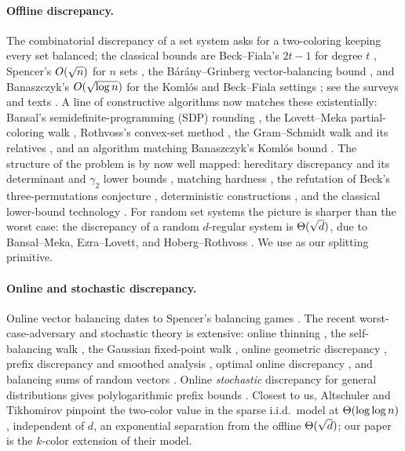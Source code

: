 \paragraph{Offline discrepancy.}
The combinatorial discrepancy of a set system asks for a two-coloring keeping every set balanced; the classical bounds are
Beck--Fiala's $2t-1$ for degree $t$ \cite{BeckFiala1981}, Spencer's $O(\sqrt n)$ for $n$ sets \cite{Spencer1985}, the
Bárány--Grinberg vector-balancing bound \cite{BaranyGrinberg1981}, and Banaszczyk's $O(\sqrt{\log n})$ for the Komlós and
Beck--Fiala settings \cite{Banaszczyk1998}; see the surveys and texts \cite{BeckSos1995,Matousek1999,Chazelle2000,AlonSpencer2016}.
A line of constructive algorithms now matches these existentially: Bansal's semidefinite-programming (SDP) rounding \cite{Bansal2010}, the Lovett--Meka
partial-coloring walk \cite{LovettMeka2015}, Rothvoss's convex-set method \cite{Rothvoss2017,EldanSingh2018}, the Gram--Schmidt
walk and its relatives \cite{BansalGarg2017,BansalDadushGargLovett2018}, and an algorithm matching Banaszczyk's Komlós bound
\cite{BansalDadushGarg2019,Nikolov2013}. The structure of the problem is by now well mapped: hereditary discrepancy and its
determinant and $\gamma_2$ lower bounds \cite{LovaszSpencerVesztergombi1986,Matousek2013,MatousekNikolov2015,Larsen2019},
matching hardness \cite{CharikarNewmanNikolov2011}, the refutation of Beck's three-permutations conjecture
\cite{NewmanNeimanNikolov2012}, deterministic constructions \cite{BansalSpencer2013}, and the classical lower-bound technology
\cite{Beck1981,Spencer1987}. For random set systems the picture is sharper than the worst case: the discrepancy of a random
$d$-regular system is $\Theta(\sqrt d)$, due to Bansal--Meka, Ezra--Lovett, and Hoberg--Rothvoss
\cite{BansalMeka2019,EzraLovett2016,HobergRothvoss2019}. We use \cite{LovettMeka2015} as our splitting primitive.

\paragraph{Online and stochastic discrepancy.}
Online vector balancing dates to Spencer's balancing games \cite{Spencer1977}. The recent worst-case-adversary and
stochastic theory is extensive: online thinning \cite{DwivediFGGR2019}, the self-balancing walk \cite{AlweissLS2021}, the
Gaussian fixed-point walk \cite{LiuSahSawhney2022}, online geometric discrepancy \cite{BansalJSS2020}, prefix discrepancy and
smoothed analysis \cite{BansalPrefix2022,BansalKomlos2022}, optimal online discrepancy \cite{KulkarniRR2024}, and balancing
sums of random vectors \cite{AruNSV2018}. Online \emph{stochastic} discrepancy for general distributions gives polylogarithmic
prefix bounds \cite{BansalStochastic2021}. Closest to us, Altschuler and Tikhomirov \cite{AT2025} pinpoint the two-color value
in the sparse i.i.d.\ model at $\Theta(\log\log n)$, independent of $d$, an exponential separation from the offline $\Theta(\sqrt d)$;
our paper is the $k$-color extension of their model.

